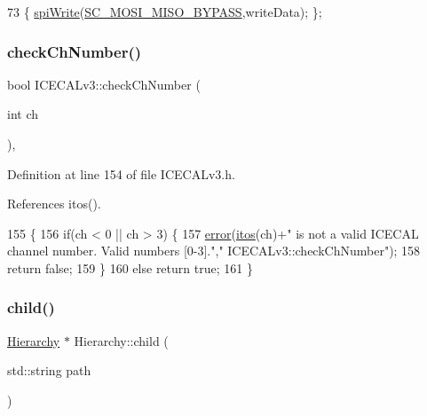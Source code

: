 \begin{DoxyCode}
73 \{       \hyperlink{classICECALv3_aef00f02801dea4bda2093c930501dcdd}{spiWrite}(\hyperlink{ICECALv3_8h_a2870f5a3cad23b2b4e7f16faefe8ef2e}{SC\_MOSI\_MISO\_BYPASS},writeData); \};
\end{DoxyCode}
\mbox{\label{classICECALv3_a8753a74558f988b346a3fe350c5bbad4}} 
\subsubsection{\texorpdfstring{check\+Ch\+Number()}{checkChNumber()}}
{\footnotesize\ttfamily bool I\+C\+E\+C\+A\+Lv3\+::check\+Ch\+Number (\begin{DoxyParamCaption}\item[{int}]{ch }\end{DoxyParamCaption})\hspace{0.3cm}{\ttfamily [inline]}, {\ttfamily [private]}}



Definition at line 154 of file I\+C\+E\+C\+A\+Lv3.\+h.



References itos().


\begin{DoxyCode}
155     \{
156         \textcolor{keywordflow}{if}(ch < 0 || ch > 3) \{
157             \hyperlink{classObject_a204a95f57818c0f811933917a30eff45}{error}(\hyperlink{Tools_8h_af330027dbdafb9a30768b3613c553e60}{itos}(ch)+\textcolor{stringliteral}{" is not a valid ICECAL channel number. Valid numbers [0-3]."},\textcolor{stringliteral}{"
      ICECALv3::checkChNumber"});
158             \textcolor{keywordflow}{return} \textcolor{keyword}{false};
159         \}
160         \textcolor{keywordflow}{else} \textcolor{keywordflow}{return} \textcolor{keyword}{true};
161     \}
\end{DoxyCode}
\mbox{\label{classHierarchy_a1e207f973c694b538bf90107b4868817}} 
\subsubsection{\texorpdfstring{child()}{child()}}
{\footnotesize\ttfamily \hyperlink{classHierarchy}{Hierarchy} $\ast$ Hierarchy\+::child (\begin{DoxyParamCaption}\item[{std\+::string}]{path }\end{DoxyParamCaption})\hspace{0.3cm}{\ttfamily [inherited]}}



